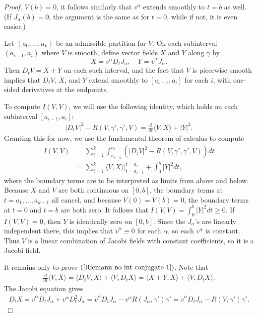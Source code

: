 \begin{proof}
$V(b)=0$, it follows similarly that $v^\alpha$ extends smoothly to $t=b$ as well. (If $J_\alpha(b)=0$, the argument is the same as for $t=0$, while if not, it is even 
easier.)\par
Let $(a_0,\dots,a_k)$ be an admissible partition for $V$. On each subinterval $(a_{i-1},a_i)$ where $V$ is smooth, define vector fields $X$ and $Y$ along $\gamma$ by
\[X=v^\alpha D_tJ_\alpha,\quad Y=\dot{v}^\alpha J_\alpha.\]
Then $D_tV=X+Y$ on each such interval, and the fact that $V$ is piecewise smooth implies that $D_tV$, $X$, and $Y$ extend smoothly to $[a_{i-1},a_i]$ for each $i$, with 
one-sided derivatives at the endpoints.\par
To compute $I(V,V)$, we will use the following identity, which holds on each subinterval $[a_{i-1},a_i]$:
\begin{align}\label{Riemann no int conjugate-1}
|D_tV|^2-R(V,\gamma',\gamma',V)=\frac{d}{dt}\langle V,X\rangle+|Y|^2.
\end{align}
Granting this for now, we use the fundamental theorem of calculus to compute
\begin{align*}
I(V,V)&=\sum_{i=1}^{k}\int_{a_{i-1}}^{a_i}(|D_tV|^2-R(V,\gamma',\gamma',V))dt\\
&=\sum_{i=1}^{k}\langle V,X\rangle\Big|_{t=a_{i-1}}^{t=a_i}+\int_0^b|Y|^2dt,
\end{align*}
where the boundary terms are to be interpreted as limits from above and below. Because $X$ and $V$ are both continuous on $[0,b]$, the boundary terms at $t=a_1,\dots,a_{k-1}$ 
all cancel, and because $V(0)=V(b)=0$, the boundary terms at $t=0$ and $t=b$ are both zero. It follows that $I(V,V)=\int_0^b|Y|^2dt\geq 0$. If $I(V,V)=0$, then $Y$ is 
identically zero on $[0,b]$. Since the $J_\alpha$'s are linearly independent there, this implies that $\dot{v}^\alpha\equiv 0$ for each $\alpha$, so each $v^\alpha$ is 
constant. Thus $V$ is a linear combination of Jacobi fields with constant coefficients, so it is a Jacobi field.\par
It remains only to prove $(\ref{Riemann no int conjugate-1})$. Note that
\begin{align}\label{Riemann no int conjugate-2}
\frac{d}{dt}\langle V,X\rangle=\langle D_tV,X\rangle+\langle V,D_tX\rangle=\langle X+Y,X\rangle+\langle V,D_tX\rangle.
\end{align}
The Jacobi equation gives
\begin{align*}
D_tX=\dot{v}^\alpha D_tJ_\alpha+v^\alpha D_t^2J_\alpha=\dot{v}^\alpha D_tJ_\alpha-v^\alpha R(J_\alpha,\gamma')\gamma'=\dot{v}^\alpha D_tJ_\alpha-R(V,\gamma')\gamma'.

\end{align*}
\end{proof}
